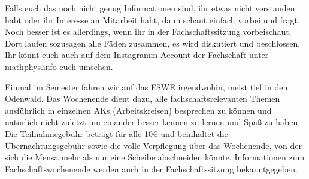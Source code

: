 

Falls euch das noch nicht genug Informationen sind, ihr etwas nicht verstanden habt oder ihr Interesse an Mitarbeit habt, dann schaut einfach vorbei und fragt. Noch besser ist es allerdings, wenn ihr in der Fachschaftssitzung vorbeischaut. Dort laufen sozusagen alle Fäden zusammen, es wird diskutiert und beschlossen. Ihr könnt euch auch auf dem Instagramm-Account der Fachschaft unter mathphys.info euch umsehen.

Einmal im Semester fahren wir auf das \gls{FSWE} irgendwohin, meist tief in den Odenwald. Das Wochenende dient dazu, alle fachschaftsrelevanten Themen ausführlich in einzelnen AKs (Arbeitskreisen) besprechen zu können und natürlich nicht zuletzt um einander besser kennen zu lernen und Spaß zu haben. Die Teilnahmegebühr beträgt für alle 10€ und beinhaltet die Übernachtungsgebühr sowie die volle Verpflegung über das Wochenende, von der sich die Mensa mehr als nur eine Scheibe abschneiden könnte. Informationen zum Fachschaftswochenende werden auch in der Fachschaftssitzung bekanntgegeben.
